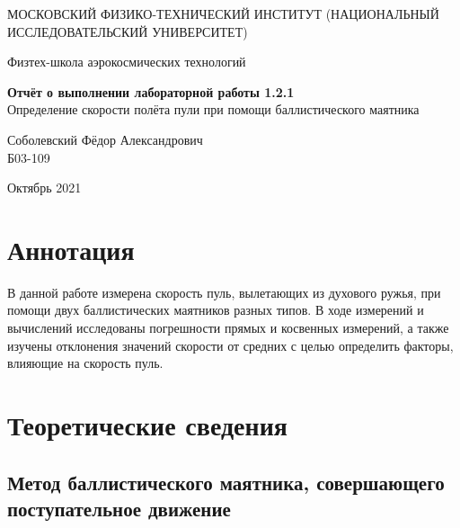 \documentclass[a4paper,12pt]{article} %
\date{\today}
\begin{document}
\begin{titlepage}
	\begin{center}
		{\large МОСКОВСКИЙ ФИЗИКО-ТЕХНИЧЕСКИЙ ИНСТИТУТ (НАЦИОНАЛЬНЫЙ ИССЛЕДОВАТЕЛЬСКИЙ УНИВЕРСИТЕТ)}
	\end{center}
	\begin{center}
		{\large Физтех-школа аэрокосмических технологий}
	\end{center}
	
	
	\vspace{4.5cm}
	{\huge
		\begin{center}
			{\bf Отчёт о выполнении лабораторной работы 1.2.1}\\
			Определение скорости полёта пули при помощи баллистического маятника
		\end{center}
	}
	\vspace{1cm}
	\begin{center}
		{\large Соболевский Фёдор Александрович \\
			\vspace{0.2cm}
			Б03-109}
	\end{center}
	\vspace{8cm}
	\begin{center}
		Октябрь 2021
	\end{center}
\end{titlepage}

\section{Аннотация}

В данной работе измерена скорость пуль, вылетающих из духового ружья, при помощи двух баллистических маятников разных типов. В ходе измерений и вычислений исследованы погрешности прямых и косвенных измерений, а также изучены отклонения значений скорости от средних с целью определить факторы, влияющие на скорость пуль.

\section{Теоретические сведения}

\subsection{Метод баллистического маятника, совершающего поступательное движение}
\end{document}
